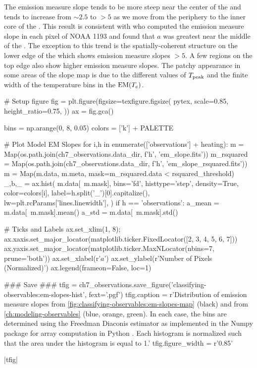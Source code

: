 The emission measure slope tends to be more steep near the center of the \AR{} and tends to increase from $\sim2.5$ to $>5$ as we move from the periphery to the inner core of the \AR{}. This result is consistent with \citet{del_zanna_evolution_2015} who computed the emission measure slope in each pixel of \AR{} NOAA 1193 and found that $a$ was greatest near the middle of the \AR{}. The exception to this trend is the spatially-coherent structure on the lower edge of the \AR{} which shows emission measure slopes $>5$. A few regions on the top edge also show higher emission measure slopes. The patchy appearance in some areas of the slope map is due to the different values of $T_\textup{peak}$ and the finite width of the temperature bins in the $\textup{EM}(T_e)$.


\begin{pycode}
# Setup figure
fig = plt.figure(figsize=texfigure.figsize(
    pytex,
    scale=0.85,
    height_ratio=0.75,
))
ax = fig.gca()

bins = np.arange(0, 8, 0.05)
colors = ['k'] + PALETTE

# Plot Model EM Slopes
for i,h in enumerate(['observations'] + heating):
    m = Map(os.path.join(ch7_observations.data_dir, f'{h}', 'em_slope.fits'))
    m_rsquared = Map(os.path.join(ch7_observations.data_dir, f'{h}', 'em_slope_rsquared.fits'))
    m = Map(m.data, m.meta, mask=m_rsquared.data < rsquared_threshold)
    _,b,_ = ax.hist(
        m.data[~m.mask],
        bins='fd',
        histtype='step',
        density=True,
        color=colors[i],
        label=h.split('_')[0].capitalize(),
        lw=plt.rcParams['lines.linewidth'],
    )
    if h == 'observations':
        a_mean = m.data[~m.mask].mean()
        a_std = m.data[~m.mask].std()

# Ticks and Labels
ax.set_xlim(1, 8);
ax.xaxis.set_major_locator(matplotlib.ticker.FixedLocator([2, 3, 4, 5, 6, 7]))
ax.yaxis.set_major_locator(matplotlib.ticker.MaxNLocator(nbins=7, prune='both'))
ax.set_xlabel(r'$a$')
ax.set_ylabel(r'Number of Pixels (Normalized)')
ax.legend(frameon=False, loc=1)

### Save ###
tfig = ch7_observations.save_figure('classifying-observables:em-slopes-hist', fext='.pgf')
tfig.caption = r'Distribution of emission measure slopes from \autoref{fig:classifying-observables:em-slopes-map} (black) and from \autoref{ch:modeling-observables} (blue, orange, green). In each case, the bins are determined using the Freedman Diaconis estimator \citep{freedman_histogram_1981} as implemented in the Numpy package for array computation in Python \citep{oliphant_guide_2006}. Each histogram is normalized such that the area under the histogram is equal to 1.'
tfig.figure_width = r'0.85\columnwidth'
\end{pycode}
|tfig|

